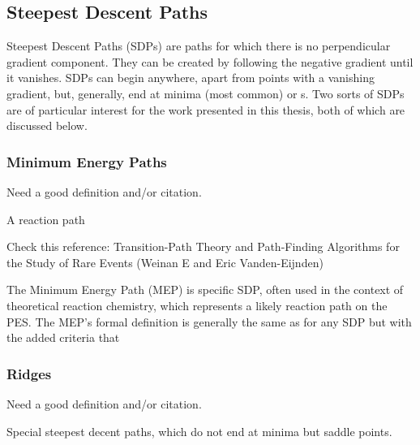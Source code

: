 \subsection{Steepest Descent Paths}
\label{sec:sdps}

Steepest Descent Paths (SDPs) are paths for which there is no perpendicular gradient component.
They can be created by following the negative gradient until it vanishes.
SDPs can begin anywhere, apart from points with a vanishing gradient, but, generally, end at minima (most common) or \sap{}s.
Two sorts of SDPs are of particular interest for the work presented in this thesis, both of which are discussed below.

\subsubsection{Minimum Energy Paths}
\label{sec:meps}

\bit
\item Need a good definition and/or citation.
\item A reaction path
\eit

Check this reference:
Transition-Path Theory and Path-Finding Algorithms for the Study of Rare Events
(Weinan E and Eric Vanden-Eijnden)

The Minimum Energy Path (MEP) is specific SDP, often used in the context of theoretical reaction chemistry, which represents a likely reaction path on the PES.
The MEP's formal definition is generally the same as for any SDP but with the added criteria that \expand

\placeholder

\subsubsection{Ridges}
\label{sec:ridges}

\bit
\item Need a good definition and/or citation.
\item Special steepest decent paths, which do not end at minima but saddle points.
\eit

\placeholder


